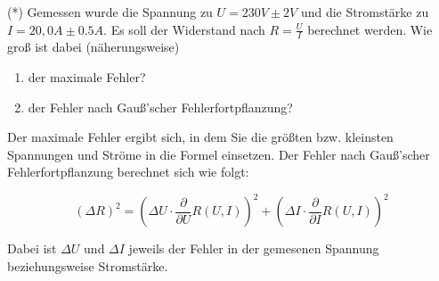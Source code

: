 \item (*) Gemessen wurde die Spannung zu $U=230V \pm 2V$ und die Stromstärke zu $I=20,0A \pm 0.5A$. Es soll der Widerstand nach $R=\frac{U}{I}$ berechnet werden. Wie groß ist dabei (näherungsweise)

\begin{enumerate}
\item der maximale Fehler?
\item der Fehler nach Gauß'scher Fehlerfortpflanzung?
\end{enumerate}

Der maximale Fehler ergibt sich, in dem Sie die größten bzw. kleinsten Spannungen und Ströme in die Formel einsetzen. Der Fehler nach Gauß'scher Fehlerfortpflanzung berechnet sich wie folgt:

$$(\Delta R)^2 = \left(\Delta U \cdot \frac{\partial}{\partial U} R(U,I)\right)^2 + \left(\Delta I \cdot \frac{\partial}{\partial I} R(U,I)\right)^2$$

Dabei ist $\Delta U$ und $\Delta I$ jeweils der Fehler in der gemesenen Spannung beziehungsweise Stromstärke.

